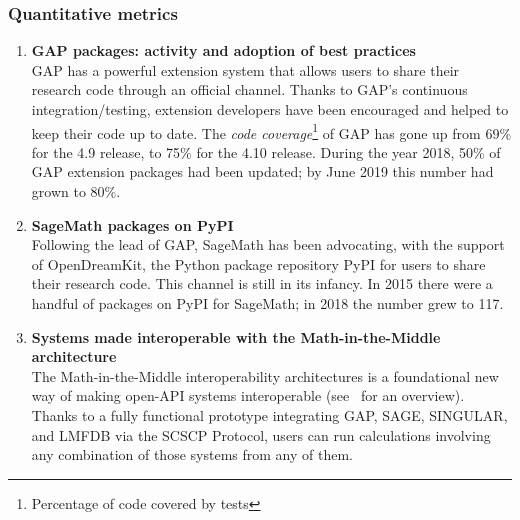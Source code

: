 \subsubsection{Quantitative metrics}

\begin{enumerate}
\item \textbf{GAP packages: activity and adoption of best practices}\\
  GAP has a powerful extension system that allows users to share their
  research code through an official channel. Thanks to GAP's
  continuous integration/testing, extension developers have been
  encouraged and helped to keep their code up to date. The \emph{code
    coverage}\footnote{Percentage of code covered by tests} of GAP has
  gone up from 69\% for the 4.9 release, to 75\% for the 4.10 release.
  During the year 2018, 50\% of GAP extension packages had been
  updated; by June 2019 this number had grown to 80\%.
\item \textbf{SageMath packages on PyPI}\\
  Following the lead of GAP, SageMath has been advocating, with the
  support of OpenDreamKit, the Python package repository PyPI for
  users to share their research code. This channel is still in its
  infancy. In 2015 there were a handful of packages on PyPI for
  SageMath; in 2018 the number grew to 117.

\item \textbf{Systems made interoperable with the Math-in-the-Middle architecture}\\
  The Math-in-the-Middle interoperability architectures is a
  foundational new way of making open-API systems interoperable
  (see~\cite{ODK-D6.5} for an overview). Thanks to a fully functional
  prototype integrating GAP, SAGE, SINGULAR, and LMFDB via the SCSCP
  Protocol, users can run calculations involving any combination of
  those systems from any of them.


\end{enumerate}
